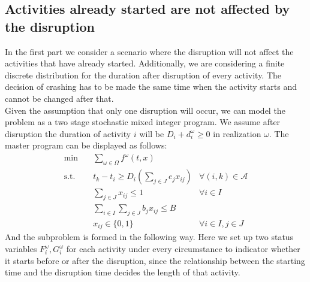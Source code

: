 \documentclass[11pt]{article}
\begin{document}
	\subsection{Activities already started are not affected by the disruption} \label{scen1}
		In the first part we consider a scenario where the disruption will not affect the activities that have already started. Additionally, we are considering a finite discrete distribution for the duration after disruption of every activity. The decision of crashing has to be made the same time when the activity starts and cannot be changed after that. \\
		\newline Given the assumption that only one disruption will occur, we can model the problem as a two stage stochastic mixed integer program. We assume after disruption the duration of activity \(i\) will be \(D_i + d_i^\omega \geq 0\) in realization \(\omega\). The master program can be displayed as follows:
		\begin{align}
			\min \quad & \sum_{\omega \in \Omega} f^\omega(t,x) &\\
			\text{s.t.} \quad & t_k - t_i \geq D_i(\sum_{j \in J} e_jx_{ij}) & \forall (i,k) \in \mathcal{A}\\
			& \sum_{j \in J} x_{ij} \leq 1 & \forall i \in I\\
			& \sum_{i \in I}\sum_{j \in J} b_jx_{ij} \leq B &\\
			& x_{ij} \in \{0,1\} & \forall i \in I, j \in J
		\end{align}
		And the subproblem is formed in the following way. Here we set up two status variables \(F_i^\omega, G_i^\omega\) for each activity under every circumstance to indicator whether it starts before or after the disruption, since the relationship between the starting time and the disruption time decides the length of that activity.
\end{document}
